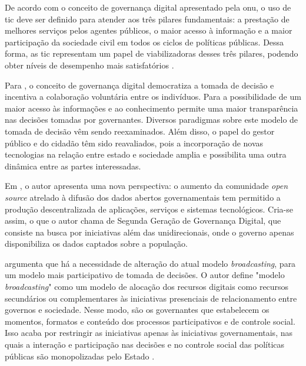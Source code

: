\par
De acordo com o conceito de governança digital apresentado pela \acrshort{onu}, o uso de \acrshort{tic} deve ser definido para atender aos três pilares fundamentais: 
a prestação de melhores serviços pelos agentes públicos, o maior acesso à informação e a maior participação da sociedade civil em todos os ciclos de políticas públicas. 
Dessa forma, as \acrshort{tic} representam um papel de viabilizadoras desses três pilares, podendo obter níveis de desempenho mais satisfatórios \cite{onu2018}. 

\par
Para , o conceito de governança digital democratiza a tomada de decisão e incentiva a colaboração voluntária entre os indivíduos. Para  a possibilidade de um maior acesso às informações e ao conhecimento permite uma maior transparência nas decisões tomadas por governantes. Diversos paradigmas sobre este modelo de tomada de decisão vêm sendo reexaminados. Além disso, o papel do gestor público e do cidadão têm sido reavaliados, pois a incorporação 
de novas tecnologias na relação entre estado e sociedade amplia e possibilita uma outra dinâmica entre as partes interessadas. 

\par
Em , o autor apresenta uma nova perspectiva: o aumento da comunidade \textit{open source} atrelado à difusão dos dados abertos governamentais tem permitido a produção descentralizada de aplicações, serviços e sistemas tecnológicos. Cria-se assim, o que o autor chama de Segunda Geração de Governança Digital, 
que consiste na busca por iniciativas além das unidirecionais, onde o governo apenas disponibiliza os dados captados sobre a população.

\par

 argumenta que há a necessidade de alteração do atual modelo \textit{broadcasting}, para um modelo mais participativo de tomada de decisões. 
O autor define "modelo \textit{broadcasting}" como um modelo de alocação dos recursos digitais como recursos secundários ou complementares 
às iniciativas presenciais de relacionamento entre governos e sociedade. Nesse modo, são os governantes que estabelecem os momentos, formatos e conteúdo dos processos 
participativos e de controle social. Isso acaba por restringir as iniciativas apenas às iniciativas governamentais, nas quais a interação e participação nas decisões e no
controle social das políticas públicas são monopolizadas pelo Estado \cite{parra2017governancca}.

